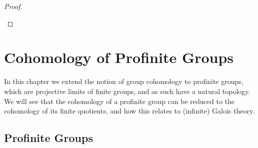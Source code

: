 \documentclass[a4paper, oneside]{memoir}
\begin{document}
\begin{proof}
\begin{center}
\label{fig:SpSeq}
    \end{center}
\end{proof}

\chapter{Cohomology of Profinite Groups}

In this chapter we extend the notion of group cohomology to profinite groups, which are projective limits of finite groups, and as such have a natural topology. We will see that the cohomology of a profinite group can be reduced to the cohomology of its finite quotients, and how this relates to (infinite) Galois theory.

\section{Profinite Groups}
\begin{remark}\label{rm:CptTotDisc}

\end{remark}
\end{document}
